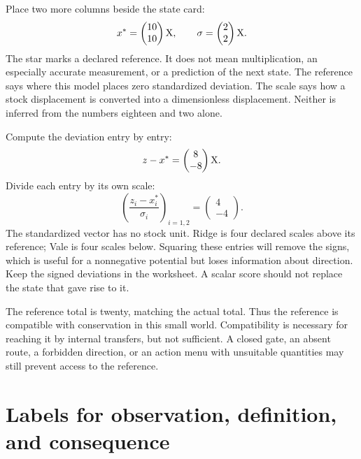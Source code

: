 Place two more columns beside the state card:
\begin{equation}
x^*=\begin{pmatrix}10\\10\end{pmatrix}\mathrm{X},
\qquad
\sigma=\begin{pmatrix}2\\2\end{pmatrix}\mathrm{X}.
\end{equation}
The star marks a declared reference. It does not mean multiplication, an especially accurate measurement, or a prediction of the next state. The reference says where this model places zero standardized deviation. The scale says how a stock displacement is converted into a dimensionless displacement. Neither is inferred from the numbers eighteen and two alone.

Compute the deviation entry by entry:
\begin{equation}
z-x^*=\begin{pmatrix}8\\-8\end{pmatrix}\mathrm{X}.
\end{equation}
Divide each entry by its own scale:
\begin{equation}
\left(\frac{z_i-x_i^*}{\sigma_i}\right)_{i=1,2}
=\begin{pmatrix}4\\-4\end{pmatrix}.
\end{equation}
The standardized vector has no stock unit. Ridge is four declared scales above its reference; Vale is four scales below. Squaring these entries will remove the signs, which is useful for a nonnegative potential but loses information about direction. Keep the signed deviations in the worksheet. A scalar score should not replace the state that gave rise to it.

The reference total is twenty, matching the actual total. Thus the reference is compatible with conservation in this small world. Compatibility is necessary for reaching it by internal transfers, but not sufficient. A closed gate, an absent route, a forbidden direction, or an action menu with unsuitable quantities may still prevent access to the reference.

\section{Labels for observation, definition, and consequence}

